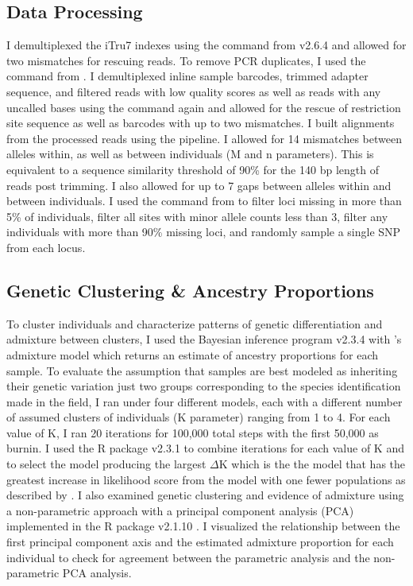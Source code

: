 \subsection{Data Processing}
I demultiplexed the iTru7 indexes using the \processradtags command from 
\stacks v2.6.4 \parencites{rochette2019} and allowed for two mismatches for rescuing reads.
To remove PCR duplicates, I used the \clonefilter command from \stacks.
I demultiplexed inline sample barcodes, trimmed adapter sequence, and filtered 
reads with low quality scores as well as reads with any uncalled bases using the  
\processradtags command again and allowed for the rescue of restriction site sequence 
as well as barcodes with up to two mismatches.  
I built alignments from the processed reads using the \stacks pipeline. 
I allowed for 14 mismatches between alleles within, as well as between individuals
(M and n parameters). This is equivalent to a sequence similarity threshold of   
90\% for the 140 bp length of reads post trimming. 
I also allowed for up to 7 gaps between alleles within and between individuals.
I used the \populations command from \stacks to filter loci missing in more than   
5\% of individuals, filter all sites with minor allele counts less than 3, filter 
any individuals with more than 90\% missing loci, and randomly sample a single
SNP from each locus.

\subsection{Genetic Clustering \& Ancestry Proportions}
To cluster individuals and characterize patterns of genetic differentiation and 
admixture between clusters, I used the Bayesian inference program 
\structure v2.3.4 \parencite{pritchard2000} with \structure's 
admixture model which returns an estimate of ancestry proportions for each sample. 
To evaluate the assumption that samples are best modeled as inheriting their    
genetic variation just two groups corresponding to the species identification  
made in the field, I ran \structure under four different models, each with a different number of 
assumed clusters of individuals (K parameter) ranging from 1 to 4. For each value of K, I 
ran 20 iterations for 100,000 total steps with the first 50,000 as burnin. 
I used the R package \pophelper v2.3.1 \parencite{francis2017} to combine
iterations for each value of K and to select the model producing the largest
$\Delta$K which is the the model that has the greatest increase in likelihood 
score from the model with one fewer populations as described by \parencite{evanno2005}.
I also examined genetic clustering and evidence of admixture using a non-parametric 
approach with a principal component analysis (PCA) implemented in the R package \adegenet v2.1.10 \parencite{jombart2008}. 
I visualized the relationship between the first principal component axis and the 
estimated admixture proportion for each individual to check for agreement  
between the parametric \structure analysis and the non-parametric PCA analysis.

